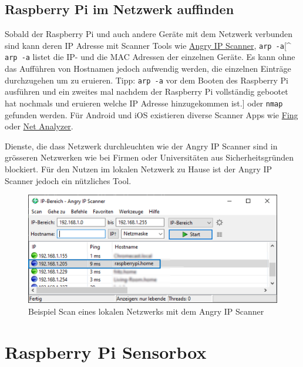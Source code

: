 \documentclass[
  11pt,
  a4paperpaper,
  oneside, openany  ,captions=tableheading
]{scrbook}
\theoremstyle{definition}
\theoremstyle{remark}
\begin{document}
\section{Raspberry Pi im Netzwerk
auffinden}\label{raspberry-pi-im-netzwerk-auffinden}

Sobald der Raspberry Pi und auch andere Geräte mit dem Netzwerk
verbunden sind kann deren IP Adresse mit Scanner Tools wie
\href{https://angryip.org}{Angry IP Scanner}, \texttt{arp\ -a}{[}\^{}
\texttt{arp\ -a} listet die IP- und die MAC Adressen der einzelnen
Geräte. Es kann ohne das Aufführen von Hostnamen jedoch aufwendig
werden, die einzelnen Einträge durchzugehen um zu eruieren. Tipp:
\texttt{arp\ -a} vor dem Booten des Raspberry Pi ausführen und ein
zweites mal nachdem der Raspberry Pi vollständig gebootet hat nochmals
und eruieren welche IP Adresse hinzugekommen ist.{]} oder \texttt{nmap}
gefunden werden. Für Android und iOS existieren diverse Scanner Apps wie
\href{https://www.fing.com/products/fing-app}{Fing} oder
\href{https://techet.net/netanalyzer}{Net Analyzer}.

Dienste, die dass Netzwerk durchleuchten wie der Angry IP Scanner sind
in grösseren Netzwerken wie bei Firmen oder Universitäten aus
Sicherheitsgründen blockiert. Für den Nutzen im lokalen Netzwerk zu
Hause ist der Angry IP Scanner jedoch ein nützliches Tool.

\begin{figure}[H]

{\centering \includegraphics{images/angryip_scanner.png}

}

\caption{Beispiel Scan eines lokalen Netzwerks mit dem Angry IP Scanner}

\end{figure}%

\chapter{Raspberry Pi Sensorbox}\label{raspberry-pi-sensorbox}
\end{document}
